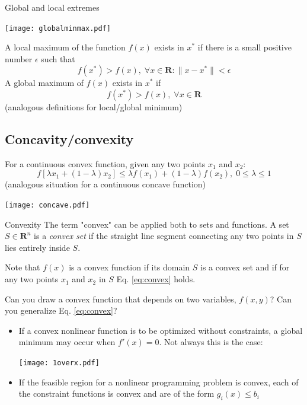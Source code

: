 \documentclass[c]{beamer}
\begin{document}
\begin{frame}[t]{Global and local extremes}
  \begin{center}
    \texttt{[image: globalminmax.pdf]}
  \end{center}

  A local maximum of the function $f(x)$ exists in $x^*$ if there is a small positive number $\epsilon$ such that
  \[
    f(x^*)>f(x), \; \forall x\in\mathbf{R} : \|x-x^*\| < \epsilon
  \]
  A global maximum of $f(x)$ exists in $x^*$ if
  \[
    f(x^*) > f(x), \; \forall x\in\mathbf{R}
  \]
  (analogous definitions for local/global minimum)
\end{frame}

\subsection{Concavity/convexity}

\begin{frame}[allowframebreaks]
  For a continuous convex function, given any two points $x_1$ and $x_2$:
  \begin{equation}
  f[\lambda x_1 +(1-\lambda)x_2] \leq \lambda f(x_1) +(1-\lambda) f(x_2), \; 0 \leq \lambda \leq 1
\label{eq:convex}
\end{equation}
    (analogous situation for a continuous concave function)
  \begin{center}
    \texttt{[image: concave.pdf]}
  \end{center}


\begin{block}{Convexity}
    The term "convex" can be applied both to sets and functions. A set $S\in \mathbf{R}^n$ is a {\it convex set} if the straight line segment connecting any two points in $S$ lies entirely inside $S$.
\end{block}
Note that $f(x)$ is a convex function if its domain $S$ is a convex set and if for any two points $x_1$ and $x_2$ in $S$ Eq. \ref{eq:convex} holds.

\begin{Exercise}
  Can you draw a convex function that depends on two variables, $f(x,y)$? Can you generalize Eq. \ref{eq:convex}?
\end{Exercise}

\end{frame}


\begin{frame}[t]
  \begin{itemize}
    \item If a convex nonlinear function is to be optimized without constraints, a global minimum may occur when $f'(x)=0$. Not always this is the case:
    \begin{center}
      \texttt{[image: 1overx.pdf]}
    \end{center}
    \item If the feasible region for a nonlinear programming problem is convex, each of the constraint functions is convex and are of the form $g_i(x)\leq b_i$
  \end{itemize}

\end{frame}
\end{document}
